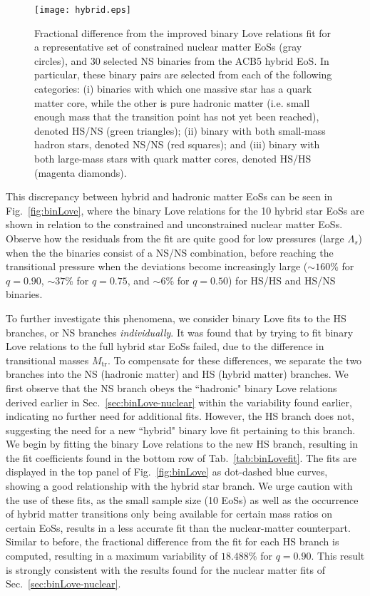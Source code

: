 \documentclass[prd,twocolumn,nofootinbib,superscriptaddress,amsmath,amssymb]{revtex4-1}
\begin{document}
\begin{figure}
\begin{center} 
\texttt{[image: hybrid.eps]}
\end{center}
\caption{
Fractional difference from the improved binary Love relations fit for a representative set of constrained nuclear matter EoSs (gray circles), and 30 selected NS binaries from the ACB5 hybrid EoS.
In particular, these binary pairs are selected from each of the following categories: (i) binaries with which one massive star has a quark matter core, while the other is pure hadronic matter (i.e. small enough mass that the transition point has not yet been reached), denoted HS/NS (green triangles); (ii) binary with both small-mass hadron stars, denoted NS/NS (red squares); and (iii) binary with both large-mass stars with quark matter cores, denoted HS/HS (magenta diamonds).
}
\label{fig:hybrid}
\end{figure} 

This discrepancy between hybrid and hadronic matter EoSs can be seen in Fig.~\ref{fig:binLove}, where the binary Love relations for the 10 hybrid star EoSs are shown in relation to the constrained and unconstrained nuclear matter EoSs.
Observe how the residuals from the fit are quite good for low pressures (large $\Lambda_s$) when the the binaries consist of a NS/NS combination, before reaching the transitional pressure when the deviations become increasingly large ($\sim160$\% for $q=0.90$, $\sim37$\% for $q=0.75$, and $\sim6$\% for $q=0.50$) for HS/HS and HS/NS binaries.

To further investigate this phenomena, we consider binary Love fits to the HS branches, or NS branches \emph{individually}.
It was found that by trying to fit binary Love relations to the full hybrid star EoSs failed, due to the difference in transitional masses $M_{\text{tr}}$.
To compensate for these differences, we separate the two branches into the NS (hadronic matter) and HS (hybrid matter) branches.
We first observe that the NS branch obeys the ``hadronic" binary Love relations derived earlier in Sec.~\ref{sec:binLove-nuclear} within the variability found earlier, indicating no further need for additional fits.
However, the HS branch does not, suggesting the need for a new ``hybrid" binary love fit pertaining to this branch.
We begin by fitting the binary Love relations to the new HS branch, resulting in the fit coefficients found in the bottom row of Tab.~\ref{tab:binLovefit}.
The fits are displayed in the top panel of Fig.~\ref{fig:binLove} as dot-dashed blue curves, showing a good relationship with the hybrid star branch.
We urge caution with the use of these fits, as the small sample size (10 EoSs) as well as the occurrence of hybrid matter transitions only being available for certain mass ratios on certain EoSs, results in a less accurate fit than the nuclear-matter counterpart.
Similar to before, the fractional difference from the fit for each HS branch is computed, resulting in a maximum variability of $18.488$\% for $q=0.90$.
This result is strongly consistent with the results found for the nuclear matter fits of Sec.~\ref{sec:binLove-nuclear}.
\end{document}
